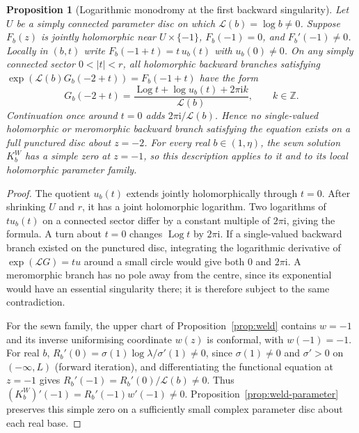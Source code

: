 \documentclass[11pt]{amsart}
\newtheorem{proposition}[theorem]{Proposition}
\theoremstyle{definition}
\newcommand{\Rr}{R}
\newcommand{\Kk}{K}
\newcommand{\ii}{\mathrm{i}}
\begin{document}
\begin{proposition}[Logarithmic monodromy at the first backward singularity]
\label{prop:backward-log-monodromy}
Let $U$ be a simply connected parameter disc on which $\mathcal L(b)=\log b\ne0$.
Suppose $F_b(z)$ is jointly holomorphic near $U\times\{-1\}$,
$F_b(-1)=0$, and $F_b'(-1)\ne0$.  Locally in $(b,t)$ write
$F_b(-1+t)=t\,u_b(t)$ with $u_b(0)\ne0$.  On any simply connected
sector $0<|t|<r$, all holomorphic backward branches satisfying
$\exp(\mathcal L(b)G_b(-2+t))=F_b(-1+t)$ have the form
\[
 G_b(-2+t)=\frac{\operatorname{Log}t+\log u_b(t)+2\pi\ii k}{\mathcal L(b)},
 \qquad k\in\mathbb Z.
\]
Continuation once around $t=0$ adds $2\pi\ii/\mathcal L(b)$.  Hence no
single-valued holomorphic or meromorphic backward branch satisfying
the equation exists on a full punctured disc about $z=-2$.
For every real $b\in(1,\eta)$, the sewn solution $\Kk_b^W$ has a
simple zero at $z=-1$, so this description applies to it and to its
local holomorphic parameter family.
\end{proposition}

\begin{proof}
The quotient $u_b(t)$ extends jointly holomorphically through $t=0$.
After shrinking $U$ and $r$, it has a joint holomorphic logarithm.
Two logarithms of $t u_b(t)$ on a connected sector differ by a constant
multiple of $2\pi\ii$, giving the formula.  A turn about $t=0$ changes
$\operatorname{Log}t$ by $2\pi\ii$.  If a single-valued backward branch existed on
the punctured disc, integrating the logarithmic derivative of
$\exp(\mathcal L G)=t u$ around a small circle would give both $0$ and $2\pi\ii$.
A meromorphic branch has no pole away from the centre, since its
exponential would have an essential singularity there; it is therefore
subject to the same contradiction.

For the sewn family, the upper chart of Proposition~\ref{prop:weld}
contains $w=-1$ and its inverse uniformising coordinate $w(z)$ is
conformal, with $w(-1)=-1$.  For real $b$,
$\Rr_b'(0)=\sigma(1)\log\lambda/\sigma'(1)\ne0$, since $\sigma(1)\ne0$ and
$\sigma'>0$ on $(-\infty,L)$ (forward iteration), and differentiating the functional
equation at $z=-1$ gives
$\Rr_b'(-1)=\Rr_b'(0)/\mathcal L(b)\ne0$.  Thus
$(\Kk_b^W)'(-1)=\Rr_b'(-1)w'(-1)\ne0$.
Proposition~\ref{prop:weld-parameter} preserves this simple zero on
a sufficiently small complex parameter disc about each real base.
\end{proof}
\end{document}
